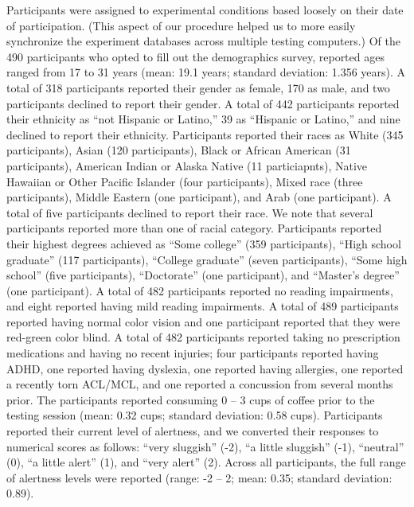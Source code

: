 \documentclass[11pt]{article}
\begin{document}
Participants were assigned to experimental conditions based loosely on their
date of participation. (This aspect of our procedure helped us to more easily
synchronize the experiment databases across multiple testing computers.) Of the
490 participants who opted to fill out the demographics survey, reported ages
ranged from 17 to 31 years (mean: 19.1 years; standard deviation: 1.356 years).
A total of 318 participants reported their gender as female, 170 as male, and
two participants declined to report their gender. A total of 442 participants
reported their ethnicity as ``not Hispanic or Latino,'' 39 as ``Hispanic or
Latino,'' and nine declined to report their ethnicity. Participants reported
their races as White (345 participants), Asian (120 participants), Black or
African American (31 participants), American Indian or Alaska Native (11
particiapnts), Native Hawaiian or Other Pacific Islander (four participants),
Mixed race (three participants), Middle Eastern (one participant), and Arab
(one participant). A total of five participants declined to report their race.
We note that several participants reported more than one of racial category.
Participants reported their highest degrees achieved as ``Some college'' (359
participants), ``High school graduate'' (117 participants), ``College
graduate'' (seven participants), ``Some high school'' (five participants),
``Doctorate'' (one participant), and ``Master's degree'' (one participant). A
total of 482 participants reported no reading impairments, and eight reported
having mild reading impairments. A total of 489 participants reported having
normal color vision and one participant reported that they were red-green color
blind. A total of 482 participants reported taking no prescription medications
and having no recent injuries; four participants reported having ADHD, one reported
having dyslexia, one reported having allergies, one reported a recently torn
ACL/MCL, and one reported a concussion from several months prior. The
participants reported consuming 0 -- 3 cups of coffee prior to the testing
session (mean: 0.32 cups; standard deviation: 0.58 cups). Participants reported
their current level of alertness, and we converted their responses to numerical
scores as follows: ``very sluggish'' (-2), ``a little sluggish'' (-1),
``neutral'' (0), ``a little alert'' (1), and ``very alert'' (2). Across all
participants, the full range of alertness levels were reported (range: -2 -- 2;
mean: 0.35; standard deviation: 0.89).
\end{document}
